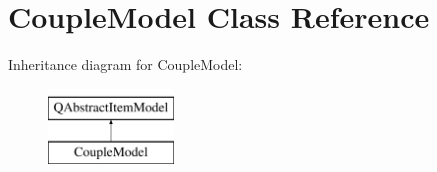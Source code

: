 \hypertarget{class_couple_model}{}\section{Couple\+Model Class Reference}
\label{class_couple_model}
Inheritance diagram for Couple\+Model\+:\begin{figure}[H]
\begin{center}
\leavevmode
\includegraphics[height=2.000000cm]{class_couple_model}
\end{center}
\end{figure}
